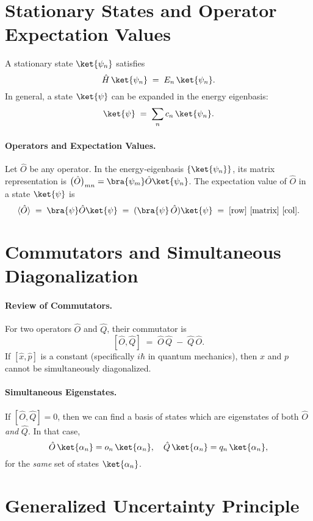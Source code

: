 \section*{Stationary States and Operator Expectation Values}

A stationary state $\ket{\psi_n}$ satisfies
\[
\hat{H}\,\ket{\psi_n} \;=\; E_n\,\ket{\psi_n}.
\]
In general, a state $\ket{\psi}$ can be expanded in the energy eigenbasis:
\[
\ket{\psi} \;=\; \sum_{n} c_n \,\ket{\psi_n}.
\]

\paragraph{Operators and Expectation Values.}
Let $\hat{O}$ be any operator.  In the energy‐eigenbasis \(\{\ket{\psi_n}\}\), its matrix representation is \(\bigl(\hat{O}\bigr)_{mn} = \bra{\psi_m}\hat{O}\ket{\psi_n}\).  
The expectation value of \(\hat{O}\) in a state \(\ket{\psi}\) is
\[
\langle \hat{O} \rangle 
\;=\; \bra{\psi}\hat{O}\ket{\psi}
\;=\;
(\bra{\psi}\,\hat{O})
\ket{\psi}
\;=\; \text{[row] [matrix] [col]}.
\]

\section*{Commutators and Simultaneous Diagonalization}

\paragraph{Review of Commutators.}
For two operators $\hat{O}$ and $\hat{Q}$, their commutator is
\[
[\hat{O}, \hat{Q}] \;=\; \hat{O}\,\hat{Q} \;-\; \hat{Q}\,\hat{O}.
\]
If $[\hat{x}, \hat{p}]$ is a constant (specifically $i\hbar$ in quantum mechanics), then $x$ and $p$ cannot be simultaneously diagonalized.

\paragraph{Simultaneous Eigenstates.}
If $[\hat{O}, \hat{Q}] = 0$, then we can find a basis of states which are eigenstates of both $\hat{O}$ \emph{and} $\hat{Q}$.  In that case,
\[
\hat{O}\,\ket{\alpha_n} = o_n\,\ket{\alpha_n},
\quad
\hat{Q}\,\ket{\alpha_n} = q_n\,\ket{\alpha_n},
\]
for the \emph{same} set of states $\ket{\alpha_n}$.

\section*{Generalized Uncertainty Principle}

